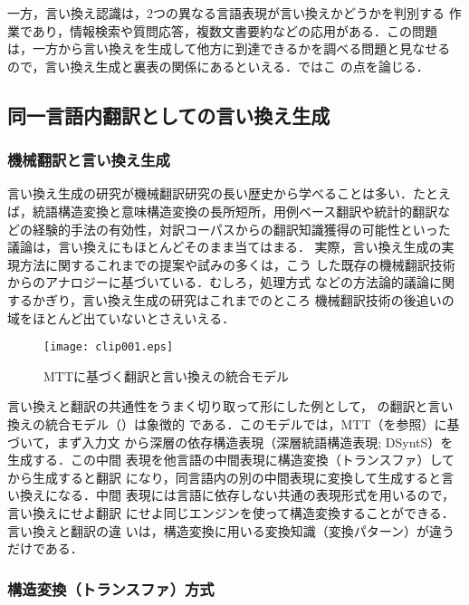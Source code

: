一方，言い換え認識は，2つの異なる言語表現が言い換えかどうかを判別する
作業であり，情報検索や質問応答，複数文書要約などの応用がある．この問題
は，一方から言い換えを生成して他方に到達できるかを調べる問題と見なせる
ので，言い換え生成と裏表の関係にあるといえる．ではこ
の点を論じる．

\subsection{同一言語内翻訳としての言い換え生成}
\label{ssec:MT}

\subsubsection{機械翻訳と言い換え生成}

言い換え生成の研究が機械翻訳研究の長い歴史から学べることは多い．たとえ
ば，統語構造変換と意味構造変換の長所短所，用例ベース翻訳や統計的翻訳な
どの経験的手法の有効性，対訳コーパスからの翻訳知識獲得の可能性といった
議論は，言い換えにもほとんどそのまま当てはまる．
実際，言い換え生成の実現方法に関するこれまでの提案や試みの多くは，こう
した既存の機械翻訳技術からのアナロジーに基づいている．むしろ，処理方式
などの方法論的議論に関するかぎり，言い換え生成の研究はこれまでのところ
機械翻訳技術の後追いの域をほとんど出ていないとさえいえる．

\begin{figure}[t]
\begin{center}
\leavevmode
\texttt{[image: clip001.eps]}
\caption{MTTに基づく翻訳と言い換えの統合モデル\cite{lavoie:00}}
\label{fig:lavoie}
\end{center}
\end{figure}

言い換えと翻訳の共通性をうまく切り取って形にした例として，
の翻訳と言い換えの統合モデル（）は象徴的
である．このモデルでは，MTT（を参照）に基づいて，まず入力文
から深層の依存構造表現（深層統語構造表現; DSyntS）を生成する．この中間
表現を他言語の中間表現に構造変換（トランスファ）してから生成すると翻訳
になり，同言語内の別の中間表現に変換して生成すると言い換えになる．中間
表現には言語に依存しない共通の表現形式を用いるので，言い換えにせよ翻訳
にせよ同じエンジンを使って構造変換することができる．言い換えと翻訳の違
いは，構造変換に用いる変換知識（変換パターン）が違うだけである．

\subsubsection{構造変換（トランスファ）方式}
\label{sssec:transfer}

